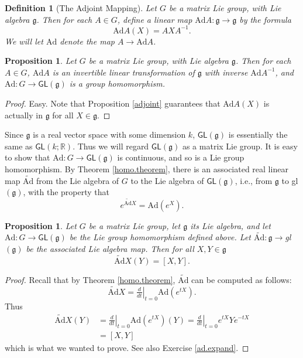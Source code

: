 \documentclass{amsbook}
\let \frak = \mathfrak
\theoremstyle{plain}
\newtheorem{definition}[theorem]{Definition}
\newtheorem{proposition}[theorem]{Proposition}
\numberwithin{equation}{chapter}
\numberwithin{theorem}{chapter}
\begin{document}
\begin{definition}
[The Adjoint Mapping]Let $G$ be a matrix Lie group, with Lie algebra
$\frak{g}$. Then for each $A\in G$, define a linear map $\mathrm{Ad}%
A:\frak{g}\rightarrow\frak{g}$ by the formula
\[
\mathrm{Ad}A(X)=AXA^{-1}\text{.}%
\]
We will let $\mathrm{Ad}$ denote the map $A\rightarrow\mathrm{Ad}A$.
\end{definition}

\begin{proposition}
Let $G$ be a matrix Lie group, with Lie algebra $\frak{g}$. Then for each
$A\in G$, $\mathrm{Ad}A$ is an invertible linear transformation of $\frak{g}$
with inverse $\mathrm{Ad}A^{-1}$, and $\mathrm{Ad}:G\rightarrow\mathsf{GL}%
(\frak{g})$ is a group homomorphism.
\end{proposition}

\begin{proof}
Easy. Note that Proposition \ref{adjoint} guarantees that $\mathrm{Ad}A(X)$ is
actually in $\frak{g}$ for all $X\in\frak{g}$.
\end{proof}

Since $\frak{g}$ is a real vector space with some dimension $k$,
$\mathsf{GL}(\frak{g})$ is essentially the same as $\mathsf{GL}(k;\mathbb{R}%
)$. Thus we will regard $\mathsf{GL}(\frak{g})$ as a matrix Lie group. It is
easy to show that $\mathrm{Ad}:G\rightarrow\mathsf{GL}(\frak{g})$ is
continuous, and so is a Lie group homomorphism. By Theorem \ref{homo.theorem},
there is an associated real linear map $\widetilde{\mathrm{Ad}}$ from the Lie
algebra of $G$ to the Lie algebra of $\mathsf{GL}(\frak{g})$, i.e., from
$\frak{g}$ to \textsf{gl}$(\frak{g})$, with the property that
\[
e^{\widetilde{\mathrm{Ad}}X}=\mathrm{Ad}\left(  e^{X}\right)  \text{.}%
\]

\begin{proposition}
\label{differentiate.Ad}Let $G$ be a matrix Lie group, let $\frak{g}$ its Lie
algebra, and let $\mathrm{Ad}:G\rightarrow\mathsf{GL}(\frak{g})$ be the Lie
group homomorphism defined above. Let $\widetilde{\mathrm{Ad}}:\frak{g}%
\rightarrow$\textsf{gl}$(\frak{g})$ be the associated Lie algebra map. Then
for all $X,Y\in\frak{g}$%
\[
\widetilde{\mathrm{Ad}}X(Y)=[X,Y]\text{.}%
\]
\end{proposition}

\begin{proof}
Recall that by Theorem \ref{homo.theorem}, $\widetilde{\mathrm{Ad}}$ can be
computed as follows:
\[
\widetilde{\mathrm{Ad}}X=\left.  \tfrac{d}{dt}\right|  _{t=0}\mathrm{Ad}%
(e^{tX})\text{.}%
\]
Thus
\begin{align*}
\widetilde{\mathrm{Ad}}X(Y)  & =\left.  \tfrac{d}{dt}\right|  _{t=0}%
\mathrm{Ad}(e^{tX})(Y)=\left.  \tfrac{d}{dt}\right|  _{t=0}e^{tX}Ye^{-tX}\\
& =[X,Y]
\end{align*}
which is what we wanted to prove. See also Exercise \ref{ad.expand}.
\end{proof}
\end{document}
